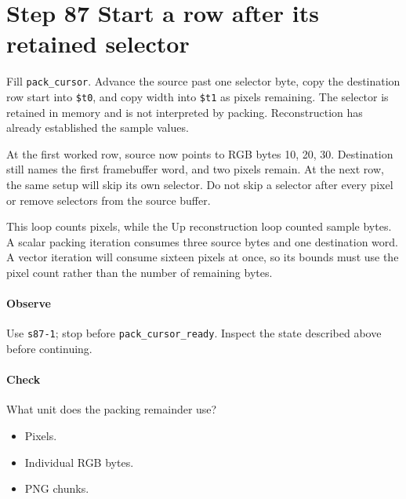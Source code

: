 \section{Step 87 Start a row after its retained selector}
Fill \texttt{pack\_cursor}. Advance the source past one selector byte, copy the destination row start into \texttt{\$t0}, and copy width into \texttt{\$t1} as pixels remaining. The selector is retained in memory and is not interpreted by packing. Reconstruction has already established the sample values.

At the first worked row, source now points to RGB bytes 10, 20, 30. Destination still names the first framebuffer word, and two pixels remain. At the next row, the same setup will skip its own selector. Do not skip a selector after every pixel or remove selectors from the source buffer.

This loop counts pixels, while the Up reconstruction loop counted sample bytes. A scalar packing iteration consumes three source bytes and one destination word. A vector iteration will consume sixteen pixels at once, so its bounds must use the pixel count rather than the number of remaining bytes.

\paragraph{Observe} Use \texttt{s87-1}; stop before \texttt{pack\_cursor\_ready}. Inspect the state described above before continuing.

\paragraph{Check} What unit does the packing remainder use?
\begin{itemize}
  \item[A.] Pixels.
  \item[B.] Individual RGB bytes.
  \item[C.] PNG chunks.
\end{itemize}
